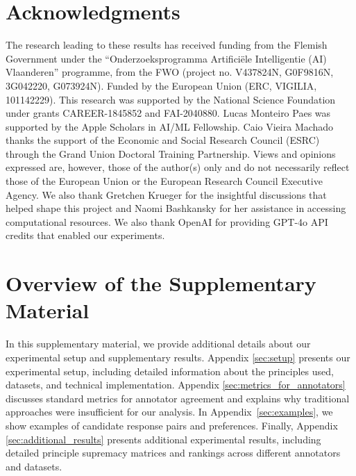 \documentclass{article}
\begin{document}
\section*{Acknowledgments}
The research leading to these results has received funding from the Flemish Government under the ``Onderzoeksprogramma Artificiële Intelligentie (AI) Vlaanderen'' programme, from the FWO (project no. V437824N, G0F9816N, 3G042220, G073924N). Funded by the European Union (ERC, VIGILIA, 101142229). 
This research was supported by the National Science Foundation under grants CAREER-1845852 and FAI-2040880. 
Lucas Monteiro Paes was supported by the Apple Scholars in AI/ML Fellowship. 
Caio Vieira Machado thanks the support of the Economic and Social Research Council (ESRC) through the Grand Union Doctoral Training Partnership.
Views and opinions expressed are, however, those of the author(s) only and do not necessarily reflect those of the European Union or the European Research Council Executive Agency. We also thank Gretchen Krueger for the insightful discussions that helped shape this project and Naomi Bashkansky for her assistance in accessing computational resources. We also thank OpenAI for providing GPT-4o API credits that enabled our experiments.






\newpage
\appendix

\section{Overview of the Supplementary Material}\label{sec:supplementary_material} 
In this supplementary material, we provide additional details about our experimental setup and supplementary results. Appendix \ref{sec:setup} presents our experimental setup, including detailed information about the principles used, datasets, and technical implementation. Appendix \ref{sec:metrics_for_annotators} discusses standard metrics for annotator agreement and explains why traditional approaches were insufficient for our analysis. In Appendix~\ref{sec:examples}, we show examples of candidate response pairs and preferences. Finally, Appendix \ref{sec:additional_results} presents additional experimental results, including detailed principle supremacy matrices and rankings across different annotators and datasets.
\end{document}
